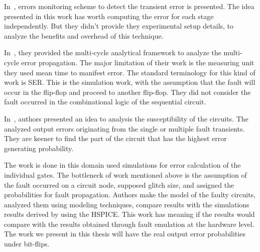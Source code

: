 In~\citep{das2007monitoring}, errors monitoring scheme to detect the transient error is presented. The idea presented in this work has worth computing the error for each stage
independently. But they didn't provide they experimental setup details, to analyze the benefits and overhead of this technique.

In~\citep{asadi2005soft}, they provided the multi-cycle analytical framework to analyze the multi-cycle error
propagation. The major limitation of their work is the measuring unit they used  mean time
to manifest error. The standard terminology for this kind of work is SER. This is the simulation work,
with the assumption that the fault will occur in the flip-flop and proceed to another flip-flop. They did not
consider the fault occurred in the combinational logic of the sequential circuit.

In~\citep{miskov2010multiple}, authors presented an idea to analysis the susceptibility of the circuits. The analyzed output
errors originating from the single or multiple fault transients. They are keener to find the part of
the circuit that has the highest error generating probability.

The work is done in this domain used simulations for error calculation of the individual gates. The bottleneck of work mentioned above is the assumption of the fault occurred on a circuit node, supposed glitch size, and assigned the
probabilities for fault propagation.  Authors make the model of the faulty circuits, analyzed them using modeling techniques, compare results with the simulations results derived by using the
HSPICE. This work has meaning if the results would compare with the results obtained through fault emulation at the hardware level. The work we present in this thesis will have the real output error probabilities under bit-flips.



\label{related}